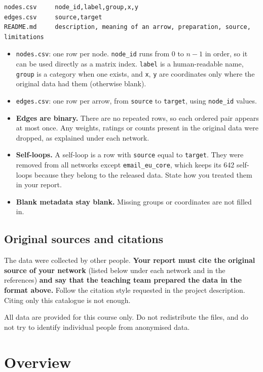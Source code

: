 \documentclass[11pt,a4paper]{article}
\newcommand{\code}[1]{\texttt{#1}}
\begin{document}
\begin{verbatim}
nodes.csv     node_id,label,group,x,y
edges.csv     source,target
README.md     description, meaning of an arrow, preparation, source, limitations
\end{verbatim}

\begin{itemize}
\item \code{nodes.csv}: one row per node. \code{node\_id} runs from $0$ to $n-1$ in order, so it can be used directly as a matrix index. \code{label} is a human-readable name, \code{group} is a category when one exists, and \code{x}, \code{y} are coordinates only where the original data had them (otherwise blank).
\item \code{edges.csv}: one row per arrow, from \code{source} to \code{target}, using \code{node\_id} values.
\item \textbf{Edges are binary.} There are no repeated rows, so each ordered pair appears at most once. Any weights, ratings or counts present in the original data were dropped, as explained under each network.
\item \textbf{Self-loops.} A self-loop is a row with \code{source} equal to \code{target}. They were removed from all networks except \code{email\_eu\_core}, which keeps its 642 self-loops because they belong to the released data. State how you treated them in your report.
\item \textbf{Blank metadata stay blank.} Missing groups or coordinates are not filled in.
\end{itemize}

\subsection*{Original sources and citations}

The data were collected by other people. \textbf{Your report must cite the original source of your network} (listed below under each network and in the references) \textbf{and say that the teaching team prepared the data in the format above.} Follow the citation style requested in the project description. Citing only this catalogue is not enough.

All data are provided for this course only. Do not redistribute the files, and do not try to identify individual people from anonymised data.

\section{Overview}
\end{document}
